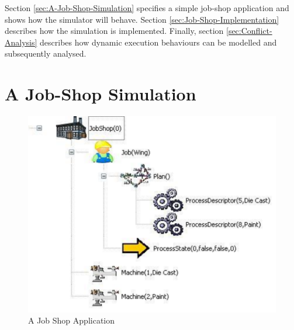 Section \ref{sec:A-Job-Shop-Simulation} specifies a simple job-shop
application and shows how the simulator will behave. Section \ref{sec:Job-Shop-Implementation}
describes how the simulation is implemented. Finally, section \ref{sec:Conflict-Analysis}
describes how dynamic execution behaviours can be modelled and subsequently
analysed.


\section{A Job-Shop Simulation}

\begin{figure} \begin{center}
\includegraphics[width=12cm]{Programming/Simulation/Images/WingJobShop.pdf}

\caption{A Job Shop Application\label{fig:A-Job-Shop-Application}}

\end{center} \end{figure}



